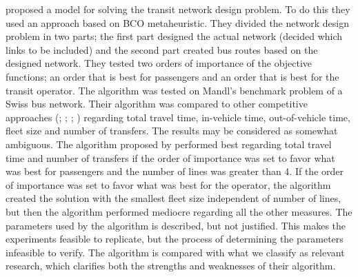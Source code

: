 \citet{nikolic14} proposed a model for solving the transit network design problem. To do this they used an approach based on BCO metaheuristic. They divided the network design problem in two parts; the first part designed the actual network (decided which links to be included) and the second part created bus routes based on the designed network. They tested two orders of importance of the objective functions; an order that is best for passengers and an order that is best for the transit operator. The algorithm was tested on Mandl's benchmark problem of a Swiss bus network\citep{mandl80}. Their algorithm was compared to other competitive approaches (\citet{mandl80}; \citet{shih94}; \citet{baaj95}; \citet{bagloee11}) regarding total travel time, in-vehicle time, out-of-vehicle time, fleet size and number of transfers. The results may be considered as somewhat ambiguous. The algorithm proposed by \citet{nikolic14} performed best regarding total travel time and number of transfers if the order of importance was set to favor what was best for passengers and the number of lines was greater than 4. If the order of importance was set to favor what was best for the operator, the algorithm created the solution with the smallest fleet size independent of number of lines, but then the algorithm performed mediocre regarding all the other measures. The parameters used by the algorithm is described, but not justified. This makes the experiments feasible to replicate, but the process of determining the parameters infeasible to verify. The algorithm is compared with what we classify as relevant research, which clarifies both the strengths and weaknesses of their algorithm. 


